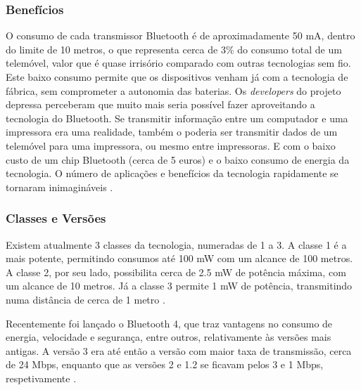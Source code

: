 \documentclass[conference]{IEEEtran}
\begin{document}
\subsubsection{Benefícios}

O consumo de cada transmissor Bluetooth é de aproximadamente 50 mA, dentro do limite de 10 metros, o que representa cerca de 3\% do consumo total de um telemóvel, valor que é quase irrisório comparado com outras tecnologias sem fio. 
Este baixo consumo permite que os dispositivos venham já com a tecnologia de fábrica, sem comprometer a autonomia das baterias. 
Os \textit{developers} do projeto depressa perceberam que muito mais seria possível fazer aproveitando a tecnologia do Bluetooth. 
Se transmitir informação entre um computador e uma impressora era uma realidade, também o poderia ser transmitir dados de um telemóvel para uma impressora, ou mesmo entre impressoras. 
E com o baixo custo de um chip Bluetooth (cerca de 5 euros) e o baixo consumo de energia da tecnologia. 
O número de aplicações e benefícios da tecnologia rapidamente se tornaram inimagináveis \cite{kobayashi2004tecnologia}.

\subsubsection{Classes e Versões}

Existem atualmente 3 classes da tecnologia, numeradas de 1 a 3. 
A classe 1 é a mais potente, permitindo consumos até 100 mW com um alcance de 100 metros. 
A classe 2, por seu lado, possibilita cerca de 2.5 mW de potência máxima, com um alcance de 10 metros. 
Já a classe 3 permite 1 mW de potência, transmitindo numa distância de cerca de 1 metro \cite{bluetoothwiki}.

Recentemente foi lançado o Bluetooth 4, que traz vantagens no consumo de energia, velocidade e segurança, entre outros, relativamente às versões mais antigas. A versão 3 era até então a versão com maior taxa de transmissão, cerca de 24 Mbps, enquanto que as versões 2 e 1.2 se ficavam pelos 3 e 1 Mbps, respetivamente \cite{bluetoothwiki}.


\end{document}
